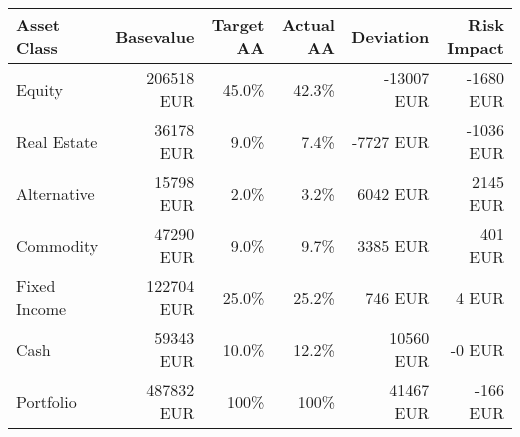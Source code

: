 \center
\label{table_port_aa}
\begin{tabular}{l|r|r|r|r|r}
Asset Class & Basevalue & Target AA & Actual AA & Deviation & Risk Impact\\\hline\hline
Equity &    206518 EUR & 45.0\% & 42.3\% &    -13007 EUR &     -1680  EUR\\
Real Estate &     36178 EUR & 9.0\% & 7.4\% &     -7727 EUR &     -1036  EUR\\
Alternative &     15798 EUR & 2.0\% & 3.2\% &      6042 EUR &      2145  EUR\\
Commodity &     47290 EUR & 9.0\% & 9.7\% &      3385 EUR &       401  EUR\\
Fixed Income &    122704 EUR & 25.0\% & 25.2\% &       746 EUR &         4  EUR\\
Cash &     59343 EUR & 10.0\% & 12.2\% &     10560 EUR &        -0  EUR\\
\hline Portfolio &    487832 EUR & 100\% & 100\% &      41467 EUR &      -166  EUR\\\hline
\end{tabular}
